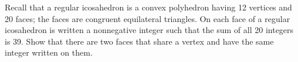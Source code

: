 Recall that a regular icosahedron is a convex polyhedron
having 12 vertices and 20 faces;
the faces are congruent equilateral triangles.
On each face of a regular icosahedron is written a nonnegative integer
such that the sum of all 20 integers is 39. Show that there are 
two faces that share a vertex and have the same integer written on them.
